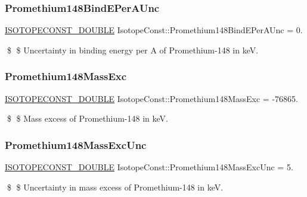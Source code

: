 \subsubsection{\texorpdfstring{Promethium148\+Bind\+E\+Per\+A\+Unc}{Promethium148BindEPerAUnc}}
{\footnotesize\ttfamily \mbox{\hyperlink{group___isotope_const-_macros_ga8f45a7272ce02c0b4c65c44636ed719a}{I\+S\+O\+T\+O\+P\+E\+C\+O\+N\+S\+T\+\_\+\+D\+O\+U\+B\+LE}} Isotope\+Const\+::\+Promethium148\+Bind\+E\+Per\+A\+Unc = 0.}

\$ \$ Uncertainty in binding energy per A of Promethium-\/148 in keV. \mbox{\label{group___isotope_const-_promethium-_pm148_ga9b7fff002062d7b2fb5a783ed1bd1252}} 
\subsubsection{\texorpdfstring{Promethium148\+Mass\+Exc}{Promethium148MassExc}}
{\footnotesize\ttfamily \mbox{\hyperlink{group___isotope_const-_macros_ga8f45a7272ce02c0b4c65c44636ed719a}{I\+S\+O\+T\+O\+P\+E\+C\+O\+N\+S\+T\+\_\+\+D\+O\+U\+B\+LE}} Isotope\+Const\+::\+Promethium148\+Mass\+Exc = -\/76865.}

\$ \$ Mass excess of Promethium-\/148 in keV. \mbox{\label{group___isotope_const-_promethium-_pm148_ga31274c2a01fdfd9e9b60934156ba1d6d}} 
\subsubsection{\texorpdfstring{Promethium148\+Mass\+Exc\+Unc}{Promethium148MassExcUnc}}
{\footnotesize\ttfamily \mbox{\hyperlink{group___isotope_const-_macros_ga8f45a7272ce02c0b4c65c44636ed719a}{I\+S\+O\+T\+O\+P\+E\+C\+O\+N\+S\+T\+\_\+\+D\+O\+U\+B\+LE}} Isotope\+Const\+::\+Promethium148\+Mass\+Exc\+Unc = 5.}

\$ \$ Uncertainty in mass excess of Promethium-\/148 in keV. \mbox{\label{group___isotope_const-_promethium-_pm148_ga9e754ea49ca665090e9dea8018438b9d}} 
